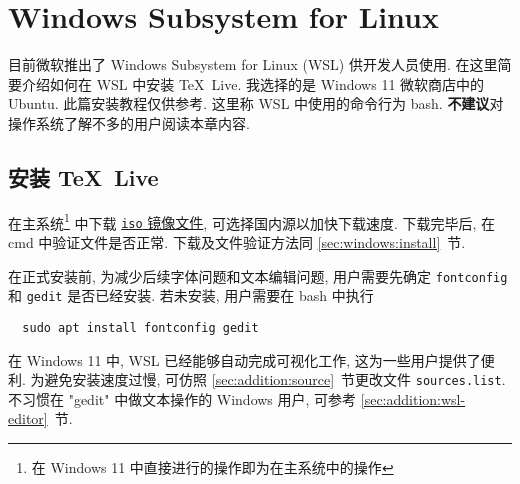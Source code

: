 
\chapter{Windows Subsystem for Linux}

目前微软推出了 Windows Subsystem for Linux (WSL) 供开发人员使用.
在这里简要介绍如何在 WSL 中安装 \TeX~Live.
我选择的是 Windows 11 微软商店中的 Ubuntu.
此篇安装教程仅供参考.
这里称 WSL 中使用的命令行为 \textsf{bash}.
\textbf{不建议}对操作系统了解不多的用户阅读本章内容.

\section{安装 \TeX~Live}

在主系统\footnote{在 Windows 11 中直接进行的操作即为在主系统中的操作}%
中下载
\href{https://mirrors.ctan.org/systems/texlive/Images/texlive2025.iso}{\texttt{iso} 镜像文件},
可选择国内源以加快下载速度.
下载完毕后, 在 \textsf{cmd} 中验证文件是否正常.
下载及文件验证方法同 \ref{sec:windows:install}~节.

在正式安装前,
为减少后续字体问题和文本编辑问题,
用户需要先确定 \texttt{fontconfig} 和 \texttt{gedit} 是否已经安装.
若未安装,
用户需要在 \textsf{bash} 中执行
\begin{lstlisting}
  sudo apt install fontconfig gedit
\end{lstlisting}
在 Windows 11 中,
WSL 已经能够自动完成可视化工作,
这为一些用户提供了便利.
为避免安装速度过慢,
可仿照 \ref{sec:addition:source}~节更改文件 \texttt{sources.list}.
不习惯在 "gedit" 中做文本操作的 Windows 用户,
可参考 \ref{sec:addition:wsl-editor}~节.

